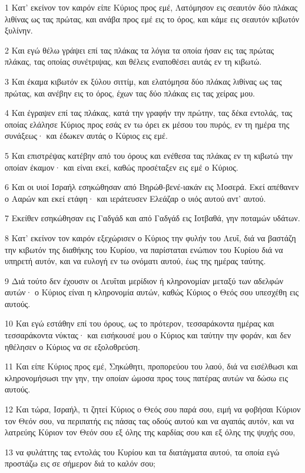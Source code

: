 \par 1 Κατ' εκείνον τον καιρόν είπε Κύριος προς εμέ, Λατόμησον εις σεαυτόν δύο πλάκας λιθίνας ως τας πρώτας, και ανάβα προς εμέ εις το όρος, και κάμε εις σεαυτόν κιβωτόν ξυλίνην.
\par 2 Και εγώ θέλω γράψει επί τας πλάκας τα λόγια τα οποία ήσαν εις τας πρώτας πλάκας, τας οποίας συνέτριψας, και θέλεις εναποθέσει αυτάς εν τη κιβωτώ.
\par 3 Και έκαμα κιβωτόν εκ ξύλου σιττίμ, και ελατόμησα δύο πλάκας λιθίνας ως τας πρώτας, και ανέβην εις το όρος, έχων τας δύο πλάκας εις τας χείρας μου.
\par 4 Και έγραψεν επί τας πλάκας, κατά την γραφήν την πρώτην, τας δέκα εντολάς, τας οποίας ελάλησε Κύριος προς εσάς εν τω όρει εκ μέσου του πυρός, εν τη ημέρα της συνάξεως· και έδωκεν αυτάς ο Κύριος εις εμέ.
\par 5 Και επιστρέψας κατέβην από του όρους και ενέθεσα τας πλάκας εν τη κιβωτώ την οποίαν έκαμον· και είναι εκεί, καθώς προσέταξεν εις εμέ ο Κύριος.
\par 6 Και οι υιοί Ισραήλ εσηκώθησαν από Βηρώθ-βενέ-ιακάν εις Μοσερά. Εκεί απέθανεν ο Ααρών και εκεί ετάφη· και ιεράτευσεν Ελεάζαρ ο υιός αυτού αντ' αυτού.
\par 7 Εκείθεν εσηκώθησαν εις Γαδγάδ και από Γαδγάδ εις Ιοτβαθά, γην ποταμών υδάτων.
\par 8 Κατ' εκείνον τον καιρόν εξεχώρισεν ο Κύριος την φυλήν του Λευΐ, διά να βαστάζη την κιβωτόν της διαθήκης του Κυρίου, να παρίσταται ενώπιον του Κυρίου διά να υπηρετή αυτόν, και να ευλογή εν τω ονόματι αυτού, έως της ημέρας ταύτης.
\par 9 Διά τούτο δεν έχουσιν οι Λευΐται μερίδιον ή κληρονομίαν μεταξύ των αδελφών αυτών· ο Κύριος είναι η κληρονομία αυτών, καθώς Κύριος ο Θεός σου υπεσχέθη εις αυτούς.
\par 10 Και εγώ εστάθην επί του όρους, ως το πρότερον, τεσσαράκοντα ημέρας και τεσσαράκοντα νύκτας· και εισήκουσέ μου ο Κύριος και ταύτην την φοράν, και δεν ηθέλησεν ο Κύριος να σε εξολοθρεύση.
\par 11 Και είπε Κύριος προς εμέ, Σηκώθητι, προπορεύου του λαού, διά να εισέλθωσι και κληρονομήσωσι την γην, την οποίαν ώμοσα προς τους πατέρας αυτών να δώσω εις αυτούς.
\par 12 Και τώρα, Ισραήλ, τι ζητεί Κύριος ο Θεός σου παρά σου, ειμή να φοβήσαι Κύριον τον Θεόν σου, να περιπατής εις πάσας τας οδούς αυτού και να αγαπάς αυτόν, και να λατρεύης Κύριον τον Θεόν σου εξ όλης της καρδίας σου και εξ όλης της ψυχής σου,
\par 13 να φυλάττης τας εντολάς του Κυρίου και τα διατάγματα αυτού, τα οποία εγώ προστάζω εις σε σήμερον διά το καλόν σου;
